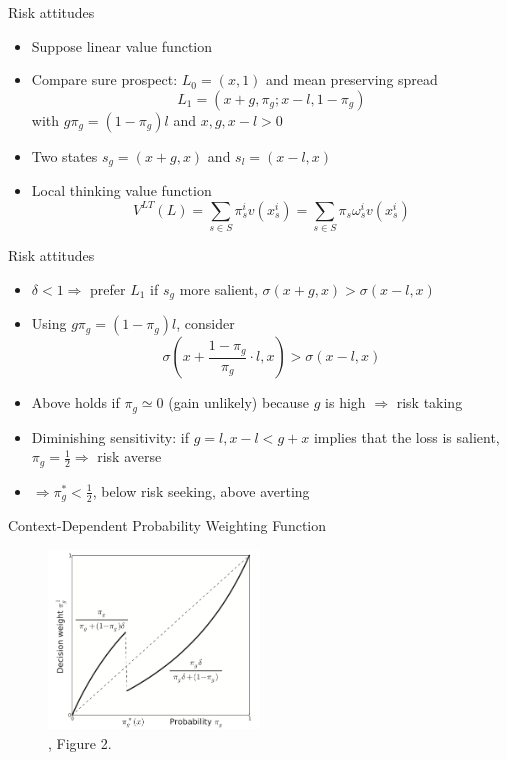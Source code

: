 \documentclass[11pt, aspectratio=169]{beamer}
\begin{document}
\begin{frame}{Risk attitudes}
        \begin{itemize}
            \item Suppose linear value function\medskip
            \item Compare sure prospect: $L_0=(x,1)$ and mean preserving spread \[L_1=\left(x+g, \pi_g ; x-l, 1-\pi_g\right)\] with $g \pi_g=\left(1-\pi_g\right) l$ and $x, g, x-l >0$\medskip
            \item Two states $s_g = (x + g, x)$ and  $s_l=(x-l, x)$\medskip
            \item Local thinking value function \[V^{LT}(L)=\sum_{s \in S} \pi^i_s v\left(x_s^i\right)=\sum_{s \in S} \pi_s \omega ^i_s v\left(x_s^i\right)\]\medskip
        \end{itemize}
    \end{frame}

\begin{frame}{Risk attitudes}
    \begin{itemize}
        \item $\delta<1 \Rightarrow$ prefer $L_1$ if $s_g$ more salient, $\sigma(x+g, x)>\sigma(x-l, x)$\medskip
        \item  Using $g \pi_g=\left(1-\pi_g\right) l$, consider \[\sigma\left(x+\frac{1-\pi_g}{\pi_g} \cdot l, x\right)>\sigma(x-l, x)\]
        \item Above holds if $\pi_g \simeq 0$ (gain unlikely) because $g$ is high $\Rightarrow$ risk taking\medskip
        \item Diminishing sensitivity: if $g=l, x-l<g+x$ implies that the loss is salient,$\pi_g=\frac{1}{2} \Rightarrow$ risk averse\medskip
        \item $\Rightarrow \pi^*_g <\frac{1}{2}$, below risk seeking, above averting\medskip
    \end{itemize}
\end{frame}


\begin{frame}{Context-Dependent Probability Weighting Function}
\begin{figure}
\centering
    \includegraphics[width = 0.5\textwidth]{context_dependent_weighting}
    \caption{\citet{BordaloGennaioliShleifer2012}, Figure 2.}
    \end{figure}
\end{frame}
\end{document}
